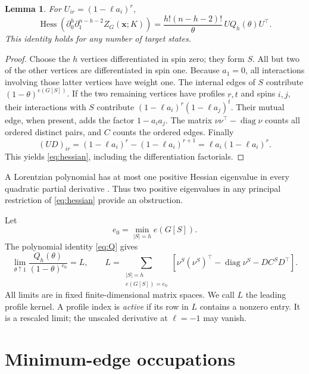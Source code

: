 \documentclass[11pt]{article}
\newtheorem{lemma}[theorem]{Lemma}
\theoremstyle{remark}\newtheorem{remark}[theorem]{Remark}
\DeclareMathOperator{\diag}{diag}
\DeclareMathOperator{\Hess}{Hess}
\begin{document}
\begin{lemma}\label{lem:identity}
For $U_{ir}=(1-\ell a_i)^r$,
\begin{equation}
 \Hess\!\left(\partial_0^h\partial_1^{n-h-2}
       Z_G(\mathbf x;K)\right)
 =\frac{h!(n-h-2)!}{\theta}\,
       UQ_h(\theta)U^\top.                       \label{eq:hessian}
\end{equation}
This identity holds for any number of target states.
\end{lemma}
\begin{proof}
Choose the $h$ vertices differentiated in spin zero; they form $S$.
All but two of the other vertices are differentiated in spin one.
Because $a_1=0$, all interactions involving those latter vertices
have weight one. The internal edges of $S$ contribute
$(1-\theta)^{e(G[S])}$.
If the two remaining vertices have profiles $r,t$ and spins $i,j$,
their interactions with $S$ contribute
$(1-\ell a_i)^r(1-\ell a_j)^t$.
Their mutual edge, when present, adds the factor $1-a_i a_j$.
The matrix $\nu\nu^\top-\diag\nu$ counts all ordered distinct pairs,
and $C$ counts the ordered edges.
Finally
\[
 (UD)_{ir}=(1-\ell a_i)^r-(1-\ell a_i)^{r+1}
           =\ell a_i(1-\ell a_i)^r.
\]
This yields \eqref{eq:hessian}, including the differentiation
factorials.
\end{proof}

A Lorentzian polynomial has at most one positive Hessian eigenvalue
in every quadratic partial derivative \cite{BH}. Thus two positive
eigenvalues in any principal restriction of \eqref{eq:hessian}
provide an obstruction.

Let
\[
 e_0=\min_{|S|=h}e(G[S]).
\]
The polynomial identity \eqref{eq:Q} gives
\begin{equation}
 \lim_{\theta\uparrow1}
 \frac{Q_h(\theta)}{(1-\theta)^{e_0}}=L,\qquad
 L=\sum_{\substack{|S|=h\\ e(G[S])=e_0}}
 \left[\nu^S(\nu^S)^\top-\diag\nu^S-D C^S D^\top\right].
                                                        \label{eq:leading}
\end{equation}
All limits are in fixed finite-dimensional matrix spaces. We call
$L$ the leading profile kernel. A profile index is \emph{active}
if its row in $L$ contains a nonzero entry. It is a rescaled limit; the
unscaled derivative at $\ell=-1$ may vanish.

\section{Minimum-edge occupations}
\end{document}
